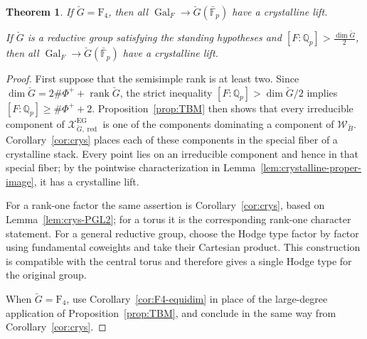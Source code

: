 \documentclass[11pt]{amsart}
\newcommand{\MAJOREDIT}[1]{{\color{revisiongreen}#1}}
\newtheorem{thm}{Theorem}[section]
\theoremstyle{definition}
\newcommand{\Q}{\mathbb{Q}}
\newcommand{\bFp}{\bar{\mathbb{F}}_p}
\newcommand{\cX}{\mathcal{X}}
\newcommand{\cW}{\mathcal{W}}
\newcommand{\bG}{\breve{G}}
\newcommand{\bB}{\breve{B}}
\DeclareMathOperator{\EG}{EG}
\DeclareMathOperator{\red}{red}
\DeclareMathOperator{\Gal}{Gal}
\begin{document}
\begin{thm}
\label{thm:maindup}
If $\bG=\mathrm{F}_4$, then all $\Gal_F\to \bG(\bFp)$
have a crystalline lift.

If $\bG$ is a reductive group satisfying the standing hypotheses
and $[F:\Q_p]>\frac{\dim \bG}{2}$, then all $\Gal_F\to \bG(\bFp)$
have a crystalline lift.
\end{thm}

\begin{proof}
\MAJOREDIT{First suppose that the semisimple rank is at least two. Since
$\dim\bG=2\#\Phi^++\operatorname{rank}\bG$, the strict inequality
$[F:\Q_p]>\dim\bG/2$ implies
$[F:\Q_p]\ge\#\Phi^++2$. Proposition~\ref{prop:TBM} then shows that every
irreducible component of $\cX_{\bG,\red}^{\EG}$ is one of the components
dominating a component of $\cW_{\bB}$. Corollary~\ref{cor:crys} places each of
these components in the special fiber of a crystalline stack. Every point lies
on an irreducible component and hence in that special fiber; by the pointwise
characterization in Lemma~\ref{lem:crystalline-proper-image}, it has a
crystalline lift.

For a rank-one factor the same assertion is Corollary~\ref{cor:crys}, based on
Lemma~\ref{lem:crys-PGL2}; for a torus it is the corresponding rank-one
character statement. For a general reductive group, choose the Hodge type
factor by factor using fundamental coweights and take their Cartesian product.
This construction is compatible with the central torus and therefore gives a
single Hodge type for the original group.

When $\bG=\mathrm F_4$, use Corollary~\ref{cor:F4-equidim} in place of the
large-degree application of Proposition~\ref{prop:TBM}, and conclude in the
same way from Corollary~\ref{cor:crys}.}
\end{proof}

\newpage
{}
{}

~

\appendix









\printbibliography
\end{document}
